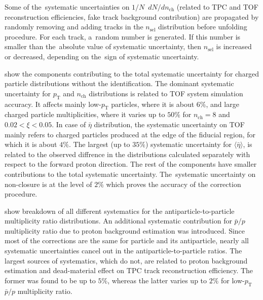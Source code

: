 Some of the~systematic uncertainties on $1/N$~$dN/dn_\textrm{ch}$ (related to TPC and TOF reconstruction efficiencies, fake track background contribution)  are propagated by randomly removing and adding tracks in the $n_\textrm{sel}$ distribution before  unfolding procedure. For each track, a~random number is generated. If this number is smaller than the~absolute value of systematic uncertainty, then $n_\textrm{sel}$ is increased or decreased, depending on the~sign of systematic uncertainty.



 show the components contributing to the total systematic uncertainty for charged particle distributions without the identification. The dominant systematic uncertainty for $p_\textrm{T}$ and $n_\textrm{ch}$ distributions is related to TOF system simulation accuracy. It affects mainly low-$p_\textrm{T}$ particles, where it is about $6\%$, and large charged particle multiplicities, where it varies up to $50\%$ for $n_\textrm{ch}=8$ and $0.02 < \xi < 0.05$. In case of $\bar{\eta}$ distribution, the systematic uncertainty on TOF mainly refers to charged particles produced at the edge of the fiducial region, for which it is about $4\%$.  The largest (up to $35\%$) systematic uncertainty for $\langle\bar{\eta}\rangle$,  is related to the observed diffrence  in the distributions calculated separately with respect to the forward proton direction. The rest of the components have smaller contributions to the total systematic uncertainty. The~systematic uncertainty on non-closure is at the level of $2\%$ which proves  the accuracy of the correction procedure. 



 show breakdown of all different systematics for the antiparticle-to-particle multiplicity ratio distributions. An additional systematic contribution for $\bar{p}/p$ multiplicity ratio due to proton background estimation was introduced.
Since most of the corrections are the same for particle and its antiparticle, nearly all systematic uncertainties cancel out in the antiparticle-to-particle ratios. 
The largest sources of systematics, which  do not, are related to proton background estimation and dead-material effect on TPC track reconstruction efficiency.  The former was found to be up to $5\%$, whereas the latter varies up to $2\%$ for low-$p_\textrm{T}$ $\bar{p}/p$ multiplicity ratio. 

